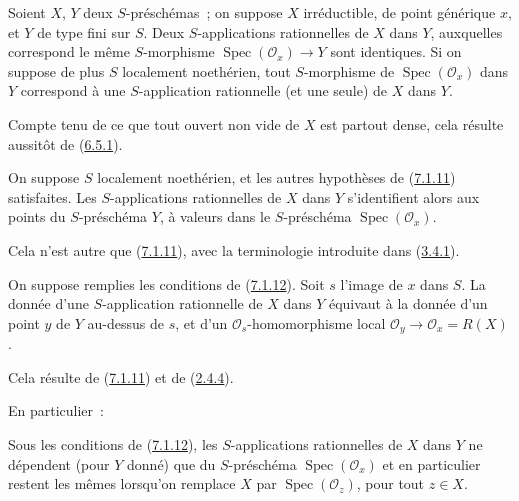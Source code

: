 \begin{proposition}[7.1.11]
\label{I.7.1.11-fr}
Soient $X$, $Y$ deux $S$-préschémas~; on suppose $X$ irréductible, de point
générique $x$, et $Y$ de type fini sur $S$. Deux $S$-applications rationnelles
de $X$ dans $Y$, auxquelles correspond le même $S$-morphisme
$\operatorname{Spec}(\mathscr{O}_x)\to Y$ sont identiques. Si on suppose de
plus $S$ localement noethérien, tout $S$-morphisme de
$\operatorname{Spec}(\mathscr{O}_x)$ dans $Y$ correspond à une $S$-application
rationnelle (et une seule) de $X$ dans $Y$.
\end{proposition}

Compte tenu de ce que tout ouvert non vide de $X$ est partout dense, cela
résulte aussitôt de (\hyperref[I.6.5.1-fr]{6.5.1}).

\begin{corollary}[7.1.12]
\label{I.7.1.12-fr}
On suppose $S$ localement noethérien, et les autres hypothèses de
(\hyperref[I.7.1.11-fr]{7.1.11}) satisfaites. Les $S$-applications rationnelles
de $X$ dans $Y$ s'identifient alors aux points du $S$-préschéma $Y$, à valeurs
dans le $S$-préschéma $\operatorname{Spec}(\mathscr{O}_x)$.
\end{corollary}

Cela n'est autre que (\hyperref[I.7.1.11-fr]{7.1.11}), avec la terminologie
introduite dans (\hyperref[I.3.4.1-fr]{3.4.1}).

\begin{corollary}[7.1.13]
\label{I.7.1.13-fr}
On suppose remplies les conditions de (\hyperref[I.7.1.12-fr]{7.1.12}). Soit
$s$ l'image de $x$ dans $S$. La donnée d'une $S$-application rationnelle de
$X$ dans $Y$ équivaut à la donnée d'un point $y$ de $Y$ au-dessus de $s$, et
d'un $\mathscr{O}_s$-homomorphisme local
$\mathscr{O}_y\to\mathscr{O}_x=R(X)$.
\end{corollary}

Cela résulte de (\hyperref[I.7.1.11-fr]{7.1.11}) et de
(\hyperref[I.2.4.4-fr]{2.4.4}).

En particulier~:

\begin{corollary}[7.1.14]
\label{I.7.1.14-fr}
Sous les conditions de (\hyperref[I.7.1.12-fr]{7.1.12}), les $S$-applications
rationnelles de $X$ dans $Y$ ne dépendent (pour $Y$ donné) que du
$S$-préschéma $\operatorname{Spec}(\mathscr{O}_x)$ et en particulier restent
les mêmes lorsqu'on remplace $X$ par
$\operatorname{Spec}(\mathscr{O}_z)$, pour tout $z\in X$.
\end{corollary}

